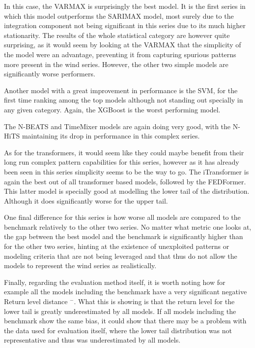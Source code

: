 In this case, the VARMAX is surprisingly the best model. It is the first series in which this model outperforms the SARIMAX model, most surely due to the integration component not being significant in this series due to its much higher stationarity. The results of the whole statistical category are however quite surprising, as it would seem by looking at the VARMAX that the simplicity of the model were an advantage, preventing it from capturing spurious patterns more present in the wind series. However, the other two simple models are significantly worse performers. 

Another model with a great improvement in performance is the SVM, for the first time ranking among the top models although not standing out specially in any given category. Again, the XGBoost is the worst performing model.

The N-BEATS and TimeMixer models are again doing very good, with the N-HiTS maintaining its drop in performance in this complex series. 

As for the transformers, it would seem like they could maybe benefit from their long run complex pattern capabilities for this series, however as it has already been seen in this series simplicity seems to be the way to go. The iTransformer is again the best out of all transformer based models, followed by the FEDFormer. This latter model is specially good at modelling the lower tail of the distribution. Although it does significantly worse for the upper tail. 

One final difference for this series is how worse all models are compared to the benchmark relatively to the other two series. No matter what metric one looks at, the gap between the best model and the benchmark is significantly higher than for the other two series, hinting at the existence of unexploited patterns or modeling criteria that are not being leveraged and that thus do not allow the models to represent the wind series as realistically. 

Finally, regarding the evaluation method itself, it is worth noting how for example all the models including the benchmark have a very significant negative Return level distance $^-$. What this is showing is that the return level for the lower tail is greatly underestimated by all models. If all models including the benchmark show the same bias, it could show that there may be a problem with the data used for evaluation itself, where the lower tail distribution was not representative and thus was underestimated by all models.

